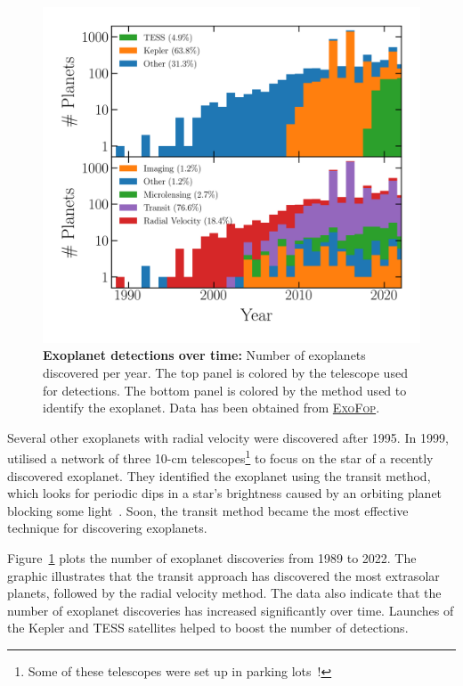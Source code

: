 \begin{figure}
\begin{center}
  \centerline{\includegraphics[width=1.\linewidth]{src/figures/confirmed_planets_vs_time.png}}
  \caption{\textbf{Exoplanet detections over time:} Number of exoplanets discovered per year. The top panel is colored by the telescope used for detections. The bottom panel is colored by the method used to identify the exoplanet. Data has been obtained from \href{https://exoplanetarchive.ipac.caltech.edu/}{\textsc{ExoFop}}. }
  \label{fig:exo_detections_over_time}
\end{center}
\end{figure}


Several other exoplanets with radial velocity were discovered after 1995.
In 1999, \citet{charbonneau1999detection} utilised a network of three 10-cm telescopes\footnote{Some of these telescopes were set up in parking lots~\cite{david_exoplanet_parkinglot}!} to focus on the star of a recently discovered exoplanet.
They identified the exoplanet using the transit method, which looks for periodic dips in a star's brightness caused by an orbiting planet blocking some light~\cite{charbonneau1999detection}.
Soon, the transit method became the most effective technique for discovering exoplanets.

Figure~\ref{fig:exo_detections_over_time} plots the number of exoplanet discoveries from 1989 to 2022. 
The graphic illustrates that the transit approach has discovered the most extrasolar planets, followed by the radial velocity method.
The data also indicate that the number of exoplanet discoveries has increased significantly over time.
Launches of the Kepler and TESS satellites helped to boost the number of detections.

